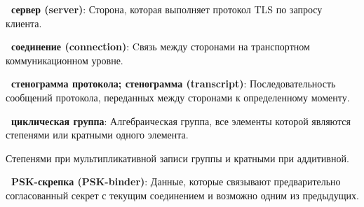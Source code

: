 {\bf \thedefctr~сервер (server)}:
Сторона, которая выполняет протокол TLS по запросу клиента.


{\bf \thedefctr~соединение (connection)}:
Cвязь между сторонами на транспортном коммуникационном уровне.


{\bf \thedefctr~стенограмма протокола; стенограмма (transcript)}: 
Последовательность сообщений протокола, переданных между сторонами к 
определенному моменту.

{\bf \thedefctr~циклическая группа}:
Алгебраическая группа, все элементы которой являются степенями или кратными
одного элемента.

\begin{note*}
Степенями при мультипликативной записи группы и кратными при аддитивной.
\end{note*}

{\bf \thedefctr~PSK-скрепка (PSK-binder)}:
Данные, которые связывают предварительно согласованный секрет с текущим 
соединением и возможно одним из предыдущих.

